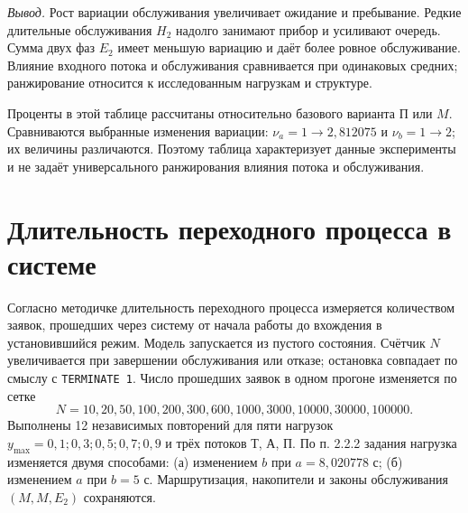 \documentclass[12pt,a4paper]{article}
\newcommand{\concl}[1]{\par\noindent\textit{Вывод.} #1\par}
\begin{document}
\concl{Рост вариации обслуживания увеличивает ожидание и пребывание. Редкие длительные обслуживания \(H_2\) надолго занимают прибор и усиливают очередь. Сумма двух фаз \(E_2\) имеет меньшую вариацию и даёт более ровное обслуживание. Влияние входного потока и обслуживания сравнивается при одинаковых средних; ранжирование относится к исследованным нагрузкам и структуре.}
\begin{center}\small\renewcommand{\arraystretch}{1.3}
\end{center}

Проценты в этой таблице рассчитаны относительно базового варианта П или \(M\). Сравниваются выбранные изменения вариации: \(\nu_a=1\to2{,}812075\) и \(\nu_b=1\to2\); их величины различаются. Поэтому таблица характеризует данные эксперименты и не задаёт универсального ранжирования влияния потока и обслуживания.

\section{Длительность переходного процесса в системе}
Согласно методичке длительность переходного процесса измеряется количеством заявок, прошедших через систему от начала работы до вхождения в установившийся режим. Модель запускается из пустого состояния. Счётчик \(N\) увеличивается при завершении обслуживания или отказе; остановка совпадает по смыслу с \texttt{TERMINATE 1}. Число прошедших заявок в одном прогоне изменяется по сетке
\begin{equation}
N=10,20,50,100,200,300,600,1000,3000,10000,30000,100000.
\end{equation}
Выполнены 12 независимых повторений для пяти нагрузок \(y_{\max}=0{,}1;0{,}3;0{,}5;0{,}7;0{,}9\) и трёх потоков Т, А, П. По п. 2.2.2 задания нагрузка изменяется двумя способами: (а) изменением \(b\) при \(a=8{,}020778\) с; (б) изменением \(a\) при \(b=5\) с. Маршрутизация, накопители и законы обслуживания \((M,M,E_2)\) сохраняются.
\end{document}
